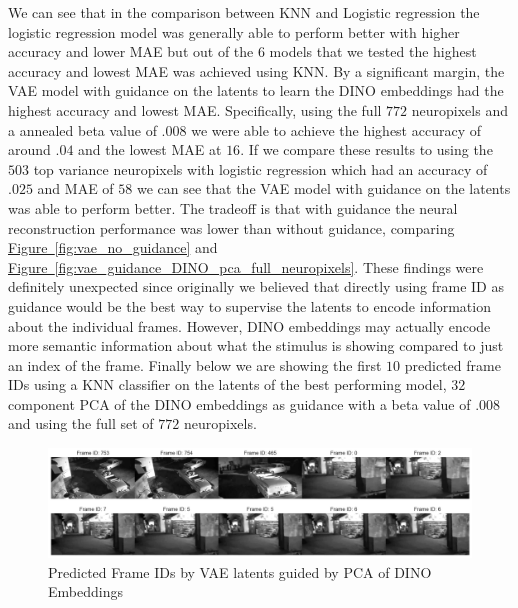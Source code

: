 \documentclass[12pt, letterpaper]{article}
\begin{document}
We can see that in the comparison between KNN and Logistic regression the logistic regression model was generally able to perform better with higher accuracy and lower MAE but out of the $6$ models that we tested the highest accuracy and lowest MAE was achieved using KNN. By a significant margin, the VAE model with guidance on the latents to learn the DINO \cite{dino} embeddings had the highest accuracy and lowest MAE. Specifically, using the full $772$ neuropixels and a annealed beta value of $.008$ we were able to achieve the highest accuracy of around $.04$ and the lowest MAE at $16$. If we compare these results to using the $503$ top variance neuropixels with logistic regression which had an accuracy of $.025$ and MAE of $58$ we can see that the VAE model with guidance on the latents was able to perform better. The tradeoff is that with guidance the neural reconstruction performance was lower than without guidance, comparing \hyperref[fig:vae_no_guidance]{Figure~\ref{fig:vae_no_guidance}} and \hyperref[fig:vae_guidance_DINO_pca_full_neuropixels]{Figure~\ref{fig:vae_guidance_DINO_pca_full_neuropixels}}. These findings were definitely unexpected since originally we believed that directly using frame ID as guidance would be the best way to supervise the latents to encode information about the individual frames. However, DINO \cite{dino} embeddings may actually encode more semantic information about what the stimulus is showing compared to just an index of the frame. Finally below we are showing the first $10$ predicted frame IDs using a KNN classifier on the latents of the best performing model, $32$ component PCA of the DINO \cite{dino} embeddings as guidance with a beta value of $.008$ and using the full set of $772$ neuropixels.

\begin{figure}[H]
    \centering
    \includegraphics[width=1.0\textwidth]{772_vae_hidden_.9_pca_DINO_knn_video.png}
    \caption{Predicted Frame IDs by VAE latents guided by PCA of DINO Embeddings}
    \label{fig:vae_frame_id_decoded_video}
\end{figure}
\end{document}
